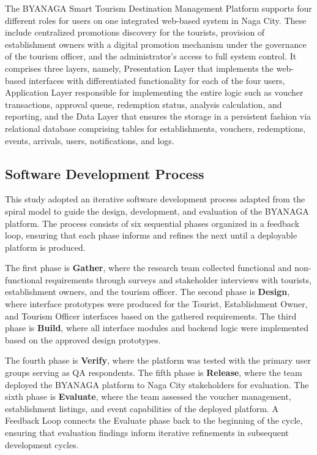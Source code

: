 \documentclass{research}
\begin{document}
The BYANAGA Smart Tourism Destination Management Platform supports four different roles for users on one integrated web-based system in Naga City. These include centralized promotions discovery for the tourists, provision of establishment owners with a digital promotion mechanism under the governance of the tourism officer, and the administrator's access to full system control. It comprises three layers, namely, Presentation Layer that implements the web-based interfaces with differentiated functionality for each of the four users, Application Layer responsible for implementing the entire logic such as voucher transactions, approval queue, redemption status, analysis calculation, and reporting, and the Data Layer that ensures the storage in a persistent fashion via relational database comprising tables for establishments, vouchers, redemptions, events, arrivals, users, notifications, and logs.

    \subsection{Software Development Process}
    This study adopted an iterative software development process adapted from
    the spiral model to guide the design, development, and evaluation of the
    BYANAGA platform. The process consists of six sequential phases organized
    in a feedback loop, ensuring that each phase informs and refines the next
    until a deployable platform is produced.

    The first phase is \textbf{Gather}, where the research team collected
    functional and non-functional requirements through surveys and stakeholder
    interviews with tourists, establishment owners, and the tourism officer.
    The second phase is \textbf{Design}, where interface prototypes were
    produced for the Tourist, Establishment Owner, and Tourism Officer
    interfaces based on the gathered requirements. The third phase is
    \textbf{Build}, where all interface modules and backend logic were
    implemented based on the approved design prototypes.

    The fourth phase is \textbf{Verify}, where the platform was tested with
    the primary user groups serving as QA respondents. The fifth phase is
    \textbf{Release}, where the team deployed the BYANAGA platform to Naga
    City stakeholders for evaluation. The sixth phase is \textbf{Evaluate},
    where the team assessed the voucher management, establishment listings,
    and event capabilities of the deployed platform. A Feedback Loop connects
    the Evaluate phase back to the beginning of the cycle, ensuring that
    evaluation findings inform iterative refinements in subsequent development
    cycles.
\end{document}
